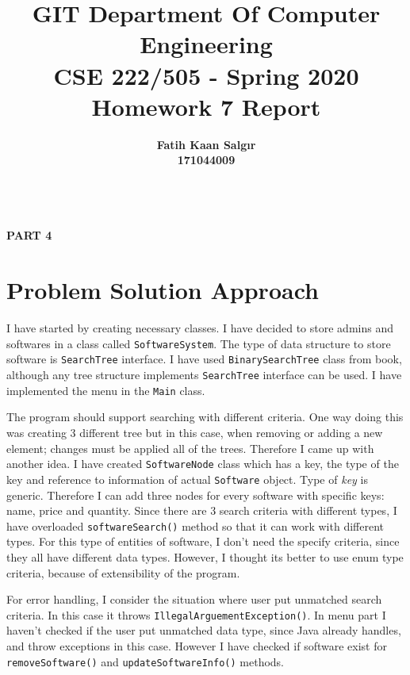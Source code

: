 \documentclass[a4paper]{article}
\title{\textbf{GIT Department Of Computer Engineering\\ 
CSE 222/505 - Spring 2020\\
Homework 7 Report \vspace{1in}}}
\author{\textbf{Fatih Kaan Salgır} \\ 
\textbf{171044009}}
\date{}
\begin{document}
\begin{large}

  \maketitle

  \newpage

  \begin{center}
    \textbf{ \\
      \vspace{3cm}
      \Huge{PART 4}
    }
  \end{center}

  \newpage

  \section{Problem Solution Approach}

  I have started by creating necessary classes. I have decided to store admins and softwares in a class called \texttt{SoftwareSystem}. The type of data structure to store software is \texttt{SearchTree} interface. I have used \texttt{BinarySearchTree} class from book, although any tree structure implements \texttt{SearchTree} interface can be used. I have implemented the menu in the \texttt{Main} class.
  \vspace{1em}

  The program should support searching with different criteria. One way doing this was creating 3 different tree but in this case, when removing or adding a new element; changes must be applied all of the trees. Therefore I came up with another idea. I have created \texttt{SoftwareNode} class which has a key, the type of the key and reference to information of actual \texttt{Software} object. Type of \textsl{key} is generic. Therefore I can add three nodes for every software with specific keys: name, price and quantity. Since there are 3 search criteria with different types, I have overloaded \texttt{softwareSearch()} method so that it can work with different types. For this type of entities of software, I don't need the specify criteria, since they all have different data types. However, I thought its better to use enum type criteria, because of extensibility of the program.

  \vspace{1em}

  For error handling, I consider the situation where user put unmatched search criteria. In this case it throws \texttt{IllegalArguementException()}. In menu part I haven't checked if the user put unmatched data type, since Java already handles, and throw exceptions in this case. However I have checked if software exist for \texttt{removeSoftware()} and \texttt{updateSoftwareInfo()} methods.



\end{large}
\end{document}

